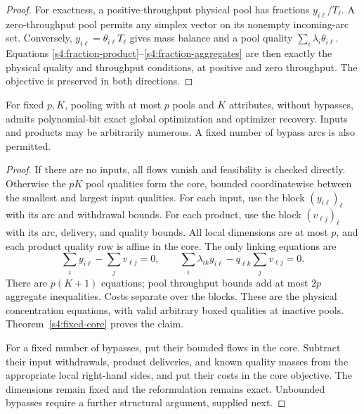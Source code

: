 \begin{proof}
For exactness, a positive-throughput physical pool has fractions
$y_{i\ell}/T_\ell$. A zero-throughput pool permits any simplex vector
on its nonempty incoming-arc set. Conversely,
$y_{i\ell}=\theta_{i\ell}T_\ell$ gives mass balance and a pool quality
$\sum_i\lambda_i\theta_{i\ell}$. Equations
\eqref{s4:fraction-product}--\eqref{s4:fraction-aggregates} are then
exactly the physical quality and throughput conditions, at positive
and zero throughput. The objective is preserved in both directions.
\end{proof}

\begin{corollary}
\label{s4:fixed-qualities}
For fixed $p,K$, pooling with at most $p$ pools and $K$ attributes,
without bypasses, admits polynomial-bit exact global optimization and
optimizer recovery. Inputs and products may be arbitrarily numerous.
A fixed number of bypass arcs is also permitted.
\end{corollary}
\begin{proof}
If there are no inputs, all flows vanish and feasibility is checked
directly. Otherwise the $pK$ pool qualities form the core, bounded
coordinatewise between the smallest and largest input qualities.
For each input, use the block $(y_{i\ell})_\ell$ with its arc and
withdrawal bounds. For each product, use the block $(v_{\ell j})_\ell$
with its arc, delivery, and quality bounds. All local dimensions are
at most $p$, and each product quality row is affine in the core.
The only linking equations are
\begin{equation}
 \sum_i y_{i\ell}-\sum_jv_{\ell j}=0,\qquad
 \sum_i\lambda_{ik}y_{i\ell}-q_{\ell k}\sum_jv_{\ell j}=0.
 \label{s4:no-bypass-balances}
\end{equation}
There are $p(K+1)$ equations; pool throughput bounds add at most $2p$
aggregate inequalities. Costs separate over the blocks. These are the
physical concentration equations, with valid arbitrary boxed qualities
at inactive pools. Theorem~\ref{s4:fixed-core} proves the claim.

For a fixed number of bypasses, put their bounded flows in the core.
Subtract their input withdrawals, product deliveries, and known quality
masses from the appropriate local right-hand sides, and put their
costs in the core objective. The dimensions remain fixed and the
reformulation remains exact. Unbounded bypasses require a further
structural argument, supplied next.
\end{proof}

